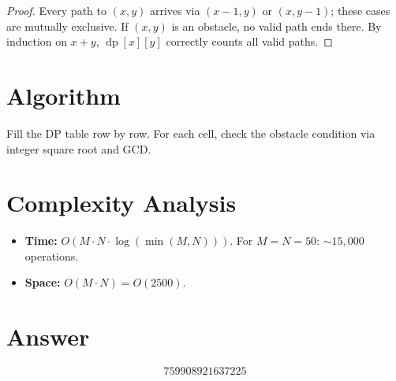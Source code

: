 \documentclass[11pt]{article}
\theoremstyle{definition}
\begin{document}
\begin{proof}
Every path to $(x,y)$ arrives via $(x-1,y)$ or $(x,y-1)$; these cases are mutually exclusive. If $(x,y)$ is an obstacle, no valid path ends there. By induction on $x + y$, $\operatorname{dp}[x][y]$ correctly counts all valid paths.
\end{proof}

\section{Algorithm}

Fill the DP table row by row. For each cell, check the obstacle condition via integer square root and GCD.

\section{Complexity Analysis}

\begin{itemize}
\item \textbf{Time:} $O(M \cdot N \cdot \log(\min(M, N)))$. For $M = N = 50$: $\sim 15{,}000$ operations.
\item \textbf{Space:} $O(M \cdot N) = O(2500)$.
\end{itemize}

\section{Answer}

\[
\boxed{759908921637225}
\]
\end{document}

